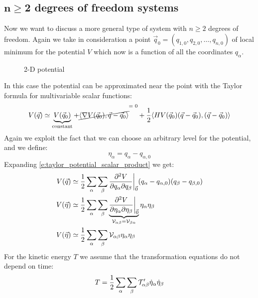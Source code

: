 \subsection{$\mathbf{n\geq 2}$ degrees of freedom systems}
Now we want to discuss a more general type of system with $n\geq2$ degrees of freedom. Again we take in consideration a point $\vec{q}_0 = (q_{1,0}, q_{2,0},\dots,q_{n,0})$ of local minimum for the potential $V$ which now is a function of all the coordinates $q_{\alpha}$.
\begin{figure}[!ht]
    \centering
    
    \caption{2-D potential}
    \label{fig:image11}
\end{figure}
In this case the potential can be approximated near the point with the Taylor formula for multivariable scalar functions:
\begin{equation} \label{e:taylor_potential_scalar_product}
    V(\vec{q}) \simeq \underbrace{V(\vec{q}_0)}_{\text{constant}} + \crossout{\langle \nabla V(\vec{q}_0), \vec{q}-\vec{q}_0\rangle} + \dfrac{1}{2}\langle H V(\vec{q}_0)(\vec{q}-\vec{q}_0), (\vec{q}-\vec{q}_0)\rangle
\end{equation}
Again we exploit the fact that we can choose an arbitrary level for the potential, and we define:
\begin{equation}
    \eta_{\alpha} = q_{\alpha} - q_{\alpha,0}
\end{equation}
Expanding \eqref{e:taylor_potential_scalar_product} we get:
\begin{equation}
    \begin{split}
        V(\vec{q}) &\simeq \dfrac{1}{2}\displaystyle\sum_{\alpha}\displaystyle\sum_{\beta}\dfrac{\partial^2 V}{\partial q_{\alpha} \partial q_{\beta}}\bigg|_{\vec{0}}(q_{\alpha} - q_{\alpha,0})(q_{\beta} - q_{\beta,0})\\
        V(\vec{\eta}) &\simeq \dfrac{1}{2}\displaystyle\sum_{\alpha}\displaystyle\sum_{\beta}\underbrace{\dfrac{\partial^2 V}{\partial \eta_{\alpha} \partial \eta_{\beta}}\bigg|_{\vec{0}}}_{\mathcal{V}_{\alpha \beta} = \mathcal{V}_{\beta \alpha}}\eta_{\alpha}\eta_{\beta}\\
        V(\vec{\eta}) &\simeq \dfrac{1}{2}\displaystyle\sum_{\alpha}\displaystyle\sum_{\beta}\mathcal{V}_{\alpha \beta}\eta_{\alpha}\eta_{\beta}
    \end{split}
\end{equation}
For the kinetic energy $T$ we assume that the transformation equations do not depend on time:
\begin{equation}
    T = \dfrac{1}{2}\displaystyle\sum_{\alpha}\displaystyle\sum_{\beta}\mathcal{T}'_{\alpha \beta} \dot{\eta}_{\alpha}\dot{\eta}_{\beta}
\end{equation}

